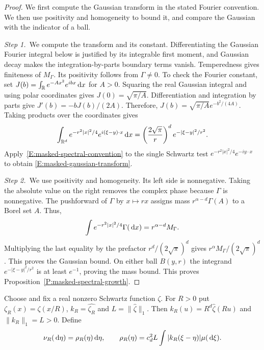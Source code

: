 \begin{proof}
  We first compute the Gaussian transform in the stated Fourier convention. We
  then use positivity and homogeneity to bound it, and compare the Gaussian
  with the indicator of a ball.

  \medskip
  \noindent\textit{Step 1.~}We compute the transform and its constant.
  Differentiating the Gaussian Fourier integral below is justified by its
  integrable first moment, and Gaussian decay makes the integration-by-parts
  boundary terms vanish.
  Temperedness gives finiteness of $M_\Gamma$. Its positivity follows from
  $\Gamma \ne 0$. To check the Fourier constant, set $J(b) = \int_{\mathbb{R}}
  e^{-Ax^2}e^{ibx}\,\mathrm{d} x$ for $A > 0$. Squaring the real Gaussian integral and
  using polar coordinates gives $J(0) = \sqrt{\pi/A}$. Differentiation and
  integration by parts give $J'(b) = -bJ(b)/(2A)$. Therefore, $J(b) =
  \sqrt{\pi/A}e^{-b^2/(4A)}$. Taking products over the coordinates gives
  \[
    \int_{\mathbb{R}^d}e^{-r^2|x|^2/4}e^{i(\xi-y)\cdot x}\,\mathrm{d} x
    = \left(\frac{2\sqrt{\pi}}r\right)^d e^{-|\xi-y|^2/r^2}.
  \]
  Apply~\eqref{E:masked-spectral-convention} to the single Schwartz test
  $e^{-r^2|x|^2/4}e^{-iy\cdot x}$ to obtain \eqref{E:masked-gaussian-transform}.

  \medskip
  \noindent\textit{Step 2.~}We use positivity and homogeneity.
  Its left side is nonnegative. Taking the absolute value on the right removes
  the complex phase because $\Gamma$ is nonnegative. The pushforward of $\Gamma$
  by $x \mapsto rx$ assigns mass $r^{\alpha-d}\Gamma(A)$ to a Borel set $A$.
  Thus,
  \[
    \int e^{-r^2|x|^2/4}\Gamma(\,\mathrm{d} x) = r^{\alpha-d}M_\Gamma.
  \]
  Multiplying the last equality by the prefactor $r^d/(2\sqrt{\pi})^d$ gives
  $r^\alpha M_\Gamma/(2\sqrt{\pi})^d$.
  This proves the Gaussian bound. On either ball $B(y,r)$ the integrand
  $e^{-|\xi-y|^2/r^2}$ is at least $e^{-1}$, proving the mass bound. This proves
  Proposition~\ref{P:masked-spectral-growth}.
\end{proof}

Choose and fix a real nonzero Schwartz function $\zeta$. For $R > 0$ put
$\zeta_R(x) = \zeta(x/R)$, $k_R = \widehat{\zeta_R}$ and $L =
\|\widehat{\zeta}\|_1$. Then $k_R(u) = R^d\widehat{\zeta}(Ru)$ and $\|k_R\|_1 =
L > 0$. Define
\begin{equation}\label{E:masked-auxiliary-measure}
  \nu_R(\,\mathrm{d}\eta) = \rho_R(\eta)\,\mathrm{d}\eta,
  \qquad \rho_R(\eta) = c_d^2L\int |k_R(\xi-\eta)|\mu(\,\mathrm{d}\xi).
\end{equation}

